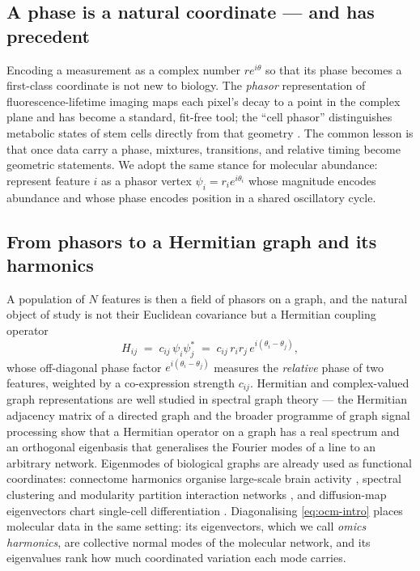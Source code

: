 \documentclass[preprint,12pt,amsmath,amssymb,superscriptaddress,floatfix]{revtex4-2}
\theoremstyle{definition}
\theoremstyle{plain}
\begin{document}
\subsection{A phase is a natural coordinate --- and has precedent}

Encoding a measurement as a complex number $r e^{i\theta}$ so that its phase
becomes a first-class coordinate is not new to biology. The \emph{phasor}
representation of fluorescence-lifetime imaging \citep{digman2008phasor,
ranjit2018fitfree} maps each pixel's decay to a point in the complex plane and
has become a standard, fit-free tool; the ``cell phasor'' distinguishes
metabolic states of stem cells directly from that geometry
\citep{stringari2011cell}. The common lesson is that once data carry a phase,
mixtures, transitions, and relative timing become geometric statements. We adopt
the same stance for molecular abundance: represent feature $i$ as a phasor
vertex $\psi_i = r_i e^{i\theta_i}$ whose magnitude encodes abundance and whose
phase encodes position in a shared oscillatory cycle.

\subsection{From phasors to a Hermitian graph and its harmonics}

A population of $N$ features is then a field of phasors on a graph, and the
natural object of study is not their Euclidean covariance but a Hermitian
coupling operator
\begin{equation}
  H_{ij} \;=\; c_{ij}\,\psi_i \psi_j^{*}
         \;=\; c_{ij}\, r_i r_j\, e^{i(\theta_i-\theta_j)},
  \label{eq:ocm-intro}
\end{equation}
whose off-diagonal phase factor $e^{i(\theta_i-\theta_j)}$ measures the
\emph{relative} phase of two features, weighted by a co-expression strength
$c_{ij}$. Hermitian and complex-valued graph representations are well studied in
spectral graph theory --- the Hermitian adjacency matrix of a directed graph
\citep{guo2017hermitian} and the broader programme of graph signal processing
\citep{shuman2013graph, chung1997spectral} show that a Hermitian operator on a
graph has a real spectrum and an orthogonal eigenbasis that generalises the
Fourier modes of a line to an arbitrary network. Eigenmodes of biological graphs
are already used as functional coordinates: connectome harmonics organise
large-scale brain activity \citep{atasoy2016connectome}, spectral clustering and
modularity partition interaction networks \citep{vonluxburg2007tutorial,
newman2006modularity}, and diffusion-map eigenvectors chart single-cell
differentiation \citep{haghverdi2015diffusion}. Diagonalising \cref{eq:ocm-intro}
places molecular data in the same setting: its eigenvectors, which we call
\emph{omics harmonics}, are collective normal modes of the molecular network,
and its eigenvalues rank how much coordinated variation each mode carries.
\end{document}

